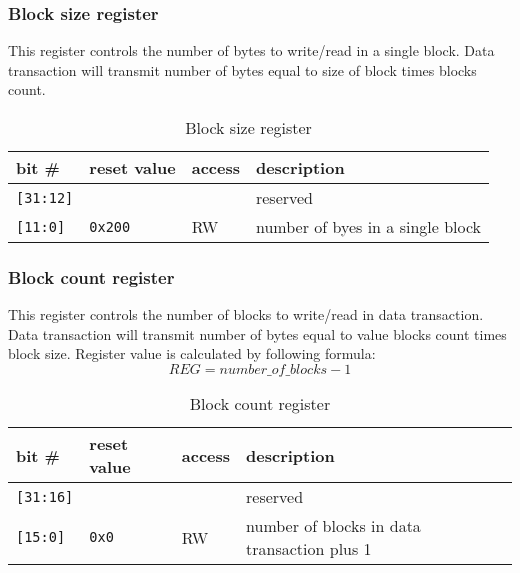     \subsubsection{Block size register}
    \label{sec:blocksize_reg}
    
    This register controls the number of bytes to write/read in a single block. Data transaction will transmit number of bytes equal to size of block times blocks count.
    
    \begin{table}[H]
    \caption{Block size register}
        \begin{tabular}{m{1.3cm}|m{2cm}|m{1cm}|m{8cm}}
                \rowcolor[gray]{0.7} bit \# & reset value & access & description \\ \hline \hline
                \texttt{[31:12]} & & & reserved \\ \hline
                \texttt{[11:0]} & \texttt{0x200} & RW & number of byes in a single block \\ \hline
                \hline
        \end{tabular}
        \label{tab:blocksize_reg}
    \end{table}
    
    \subsubsection{Block count register}
    \label{sec:blockcnt_reg}
    
    This register controls the number of blocks to write/read in data transaction. Data transaction will transmit number of bytes equal to value blocks count times block size.
    Register value is calculated by following formula:
    \begin{equation}
    REG = number\_of\_blocks - 1
    \end{equation} 
    
    \begin{table}[H]
    \caption{Block count register}
        \begin{tabular}{m{1.3cm}|m{2cm}|m{1cm}|m{8cm}}
                \rowcolor[gray]{0.7} bit \# & reset value & access & description \\ \hline \hline
                \texttt{[31:16]} & & & reserved \\ \hline
                \texttt{[15:0]} & \texttt{0x0} & RW & number of blocks in data transaction plus 1 \\ \hline
                \hline
        \end{tabular}
        \label{tab:blockcnt_reg}
    \end{table}
    
